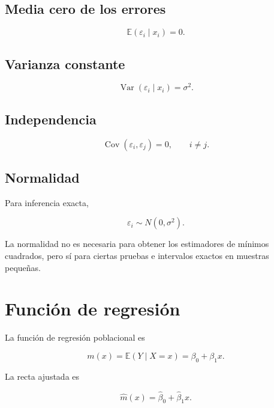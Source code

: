 \documentclass[
  spanish,
  10.5pt,
  letterpaper,
  DIV=11,
  numbers=noendperiod,
  oneside,
  open=any]{scrreprt}
\theoremstyle{definition}
\theoremstyle{definition}
\theoremstyle{plain}
\theoremstyle{remark}
\begin{document}
\subsection*{Media cero de los errores}\label{media-cero-de-los-errores}

\[
\mathbb{E}(\varepsilon_i\mid x_i)=0.
\]

\subsection*{Varianza constante}\label{varianza-constante}

\[
\operatorname{Var}(\varepsilon_i\mid x_i)
=
\sigma^2.
\]

\subsection*{Independencia}\label{independencia-1}

\[
\operatorname{Cov}(\varepsilon_i,\varepsilon_j)=0,
\qquad
i\neq j.
\]

\subsection*{Normalidad}\label{normalidad}

Para inferencia exacta,

\[
\varepsilon_i
\sim
N(0,\sigma^2).
\]

La normalidad no es necesaria para obtener los estimadores de mínimos
cuadrados, pero sí para ciertas pruebas e intervalos exactos en muestras
pequeñas.

\section*{Función de regresión}\label{funciuxf3n-de-regresiuxf3n}


La función de regresión poblacional es

\[
m(x)
=
\mathbb{E}(Y\mid X=x)
=
\beta_0+\beta_1x.
\]

La recta ajustada es

\[
\widehat{m}(x)
=
\widehat{\beta}_0
+
\widehat{\beta}_1x.
\]
\end{document}
